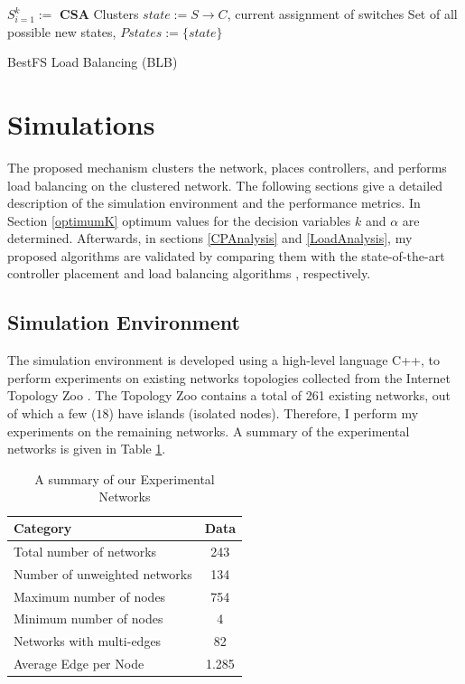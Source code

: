 \documentclass[preprint,12pt]{elsarticle}
\begin{document}
	
	\begin{algorithm}
		\SetAlgoLined
		$S_{i=1}^k := $ \textbf{CSA} Clusters\;
		$state := S \rightarrow C$, current assignment of switches\;
		Set of all possible new states, $Pstates := \{state\}$\;
		\caption{BestFS Load Balancing (BLB)} \label{algo:blb}
	\end{algorithm}
	
	\section{Simulations} \label{simulations}
	
	The proposed mechanism clusters the network, places controllers, and performs load balancing on the clustered network. The following sections give a detailed description of the simulation environment and the performance metrics. In Section \ref{optimumK} optimum values for the decision variables $k$ and $\alpha$ are determined. Afterwards, in sections \ref{CPAnalysis} and \ref{LoadAnalysis}, my proposed algorithms are validated by comparing them with the state-of-the-art controller placement \cite{dbcp2017} and load balancing algorithms \cite{filali2018sdn}, respectively.
	
	\subsection{Simulation Environment}
	The simulation environment is developed using a high-level language C++, to perform experiments on existing networks topologies collected from the Internet Topology Zoo \cite{knight2011internet}. The Topology Zoo contains a total of 261 existing networks, out of which a few ($18$) have islands (isolated nodes). Therefore, I perform my experiments on the remaining networks. A summary of the experimental networks is given in Table \ref{tab:zooSummary}.
	\begin{table}
		\centering
		\caption{A summary of our Experimental Networks} \label{tab:zooSummary}
		\begin{tabular}{|l|c|}
			\hline
			\textbf{Category} & \textbf{Data} \\
			\hline
			Total number of networks & 243 \\
			\hline
			Number of unweighted networks & 134 \\
			\hline
			Maximum number of nodes & 754 \\
			\hline
			Minimum number of nodes & 4 \\
			\hline
			Networks with multi-edges & 82\\
			\hline
			Average Edge per Node & 1.285 \\
			\hline
		\end{tabular}
	\end{table}
\end{document}
